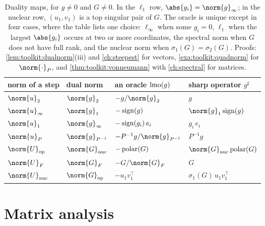 \begin{refsection}
\begin{table}[t]
\centering\small
\renewcommand{\arraystretch}{1.18}
\begin{tabular}{@{}llll@{}}
\toprule
norm of a step & dual norm & an oracle $\operatorname{lmo}(g)$ & sharp operator $g^\sharp$\\
\midrule
$\norm{u}_2$ & $\norm{g}_2$ & $-g/\norm{g}_2$ & $g$\\
$\norm{u}_\infty$ & $\norm{g}_1$ & $-\operatorname{sign}(g)$ & $\norm{g}_1\sign(g)$\\
$\norm{u}_1$ & $\norm{g}_\infty$ & $-\operatorname{sign}(g_i)\,e_i$ & $g_i\,e_i$\\
$\norm{u}_P$ & $\norm{g}_{P^{-1}}$ & $-P^{-1}g/\norm{g}_{P^{-1}}$ & $P^{-1}g$\\
$\norm{U}_{\op}$ & $\norm{G}_{\nuc}$ & $-\operatorname{polar}(G)$ & $\norm{G}_{\nuc}\polar(G)$\\
$\norm{U}_F$ & $\norm{G}_F$ & $-G/\norm{G}_F$ & $G$\\
$\norm{U}_{\nuc}$ & $\norm{G}_{\op}$ & $-u_1v_1^\top$ & $\sigma_1(G)\,u_1v_1^\top$\\
\bottomrule
\end{tabular}
\caption{Duality maps, for $g\ne0$ and $G\ne0$. In the $\ell_1$ row, $\abs{g_i}=\norm{g}_\infty$; in the nuclear row, $(u_1,v_1)$ is a top singular pair of $G$. The oracle is unique except in four cases, where the table lists one choice: $\ell_\infty$ when some $g_i=0$, $\ell_1$ when the largest $\abs{g_i}$ occurs at two or more coordinates, the spectral norm when $G$ does not have full rank, and the nuclear norm when $\sigma_1(G)=\sigma_2(G)$. Proofs: \cref{lem:toolkit:dualnorm}(iii) and \cref{ch:steepest} for vectors, \cref{exa:toolkit:quadnorm} for $\norm{\cdot}_P$, and \cref{thm:toolkit:vonneumann} with \cref{ch:spectral} for matrices.}
\label{tab:toolkit:duality}
\end{table}

\section{Matrix analysis}\label{sec:toolkit:matrices}


\end{refsection}
